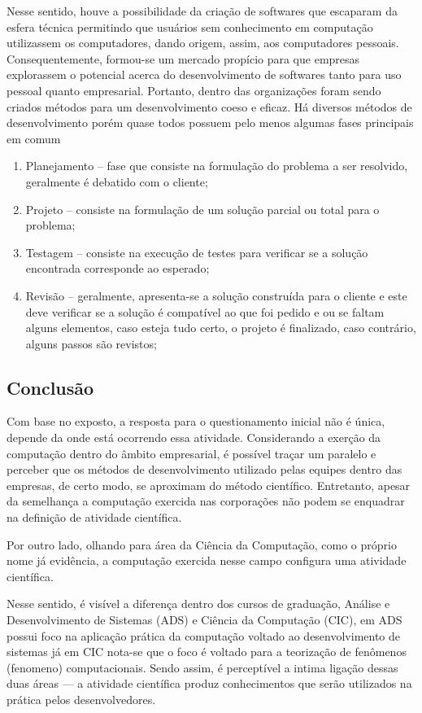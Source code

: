 Nesse sentido, houve a possibilidade da criação de softwares que escaparam da esfera técnica permitindo que usuários sem conhecimento em computação utilizassem os computadores, dando origem, assim, aos computadores pessoais. Consequentemente, formou-se um mercado propício para que empresas explorassem o potencial acerca do desenvolvimento de softwares tanto para uso pessoal quanto empresarial. Portanto, dentro das organizações foram sendo criados métodos para um desenvolvimento coeso e eficaz. Há diversos métodos de desenvolvimento porém quase todos possuem pelo menos algumas fases principais em comum

\begin{enumerate}
    \item Planejamento -- fase que consiste na formulação do problema a ser resolvido, geralmente é debatido com o cliente;
    \item Projeto -- consiste na formulação de um solução parcial ou total para o problema;
    \item Testagem -- consiste na execução de testes para verificar se a solução encontrada corresponde ao esperado;
    \item Revisão -- geralmente, apresenta-se a solução construída para o cliente e este deve verificar se a solução é compatível ao que foi pedido e ou se faltam alguns elementos, caso esteja tudo certo, o projeto é finalizado, caso contrário, alguns passos são revistos;
    
\end{enumerate}
\subsection{Conclusão }

Com base no exposto, a resposta para o questionamento inicial não é única, depende da onde está ocorrendo essa atividade. Considerando a exerção da computação dentro do âmbito empresarial, é possível traçar um paralelo e perceber que os métodos de desenvolvimento utilizado pelas equipes dentro das empresas, de certo modo, se aproximam do método científico. Entretanto, apesar da semelhança a computação exercida nas corporações não podem se enquadrar na definição de atividade científica. 

Por outro lado, olhando para área da Ciência da Computação, como o próprio nome já evidência, a computação exercida nesse campo configura uma atividade científica.

Nesse sentido, é visível a diferença dentro dos cursos de graduação, Análise e Desenvolvimento de Sistemas (ADS) e Ciência da Computação (CIC), em ADS possui foco na aplicação prática da computação voltado ao desenvolvimento de sistemas já em CIC nota-se que o foco é voltado para a teorização de fenômenos (\gls{fenomeno}) computacionais. Sendo assim, é perceptível a intima ligação dessas duas áreas --- a atividade científica produz conhecimentos que serão utilizados na prática pelos desenvolvedores.

